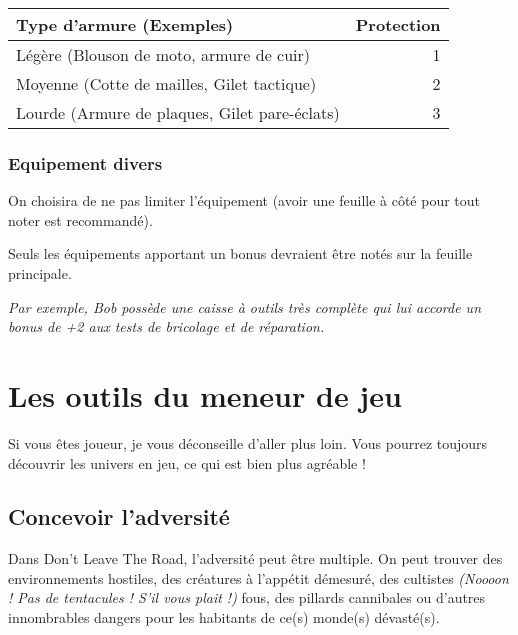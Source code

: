 \documentclass[twoside,12pt,english]{book}
\begin{document}
\begin{tabular}{lr}\\\toprule  
Type d'armure (Exemples) & Protection \\\midrule
Légère (Blouson de moto, armure de cuir) & 1 \\  
Moyenne (Cotte de mailles, Gilet tactique) & 2 \\ 
Lourde (Armure de plaques, Gilet pare-éclats) & 3 \\  \bottomrule
\end{tabular}

\subsection{Equipement divers}

On choisira de ne pas limiter l'équipement (avoir une feuille à côté pour tout noter est recommandé).

Seuls les équipements apportant un bonus devraient être notés sur la feuille principale.

\emph{Par exemple, Bob possède une caisse à outils très complète qui lui accorde un bonus de +2 aux tests de bricolage et de réparation.}

\chapter{Les outils du meneur de jeu}
\newpage

Si vous êtes joueur, je vous déconseille d'aller plus loin. Vous pourrez toujours découvrir les univers en jeu, ce qui est bien plus agréable !

\section{Concevoir l'adversité}

Dans Don't Leave The Road, l'adversité peut être multiple. On peut trouver des environnements hostiles, des créatures à l'appétit démesuré, des cultistes \emph{(Noooon ! Pas de tentacules ! S'il vous plait !)} fous, des pillards cannibales ou d'autres innombrables dangers pour les habitants de ce(s) monde(s) dévasté(s).
\end{document}
